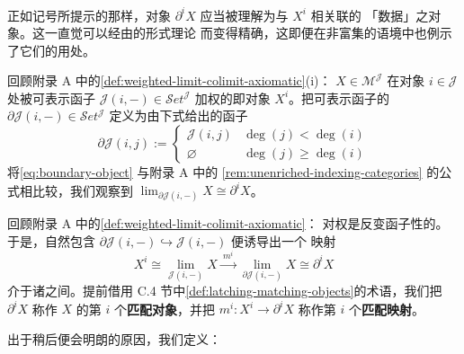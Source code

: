 \begin{observation}\label{obs:boundary-weighted-limit}
正如记号所提示的那样，对象 $\partial^i X$ 应当被理解为与 $X^i$ 相关联的
「\trBoundary{}数据」之对象。这一直觉可以经由\trWeightedLimit{}的形式理论
而变得精确，这即便在非富集的语境中也例示了它们的用处。

回顾附录 A 中的\cref{def:weighted-limit-colimit-axiomatic}(i)：\trDiagram
$X\in\mathcal{M}^{\mathcal{J}}$ 在对象 $i\in\mathcal{J}$ 处被可表示函子
$\mathcal{J}(i,-)\in\mathcal{S}et^{\mathcal{J}}$ 加权的\trLimit{}即对象
$X^i$。把可表示函子的\textbf{\trBoundary}
$\partial\mathcal{J}(i,-)\in\mathcal{S}et^{\mathcal{J}}$ 定义为由下式给出的函子
\[
\partial\mathcal{J}(i,j):=\begin{cases}
\mathcal{J}(i,j) & \deg(j)<\deg(i)\\
\varnothing & \deg(j)\geq\deg(i)
\end{cases}
\]
将\eqref{eq:boundary-object} 与附录 A 中的%
\cref{rem:unenriched-indexing-categories} 的公式相比较，我们观察到
$\operatorname{lim}_{\partial\mathcal{J}(i,-)}X\cong\partial^i X$。

回顾附录 A 中的\cref{def:weighted-limit-colimit-axiomatic}：\trWeightedLimit{}%
对权是反变函子性的。于是，自然包含
$\partial\mathcal{J}(i,-)\hookrightarrow\mathcal{J}(i,-)$ 便诱导出一个%
\trCanonical{}映射
\[
X^i\cong\operatorname{lim}_{\mathcal{J}(i,-)}X
\xrightarrow{\ m^i\ }
\operatorname{lim}_{\partial\mathcal{J}(i,-)}X
\cong\partial^i X
\]
介于诸\trWeightedLimit{}之间。提前借用 C.4 节中\cref{def:latching-matching-objects}的术语，我们把
$\partial^i X$ 称作\trDiagram{} $X$ 的第 $i$ 个\textbf{匹配对象}，并把
$m^i\colon X^i\to\partial^i X$ 称作第 $i$ 个\textbf{匹配映射}。
\end{observation}

出于稍后便会明朗的原因，我们定义：

